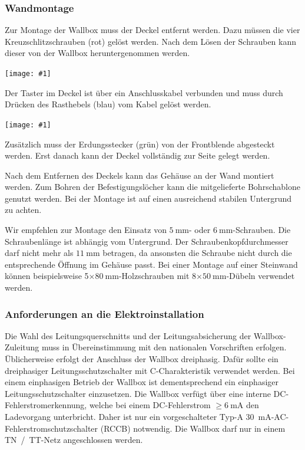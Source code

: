 \documentclass[a4paper,10pt]{article}
\newcommand{\hint}[1]{\begin{tcolorbox}[colback=boxgray,colframe=black,coltext=
white,title=Hinweis,left*=2mm,right*=2mm,boxsep=1mm,bottom=1mm,top=1mm]#1\end{tcolorbox}}
\newcommand{\gfx}[1]{\texttt{[image: \#1]}}
\begin{document}
\begin{multicols*}{2}
    \subsubsection{Wandmontage}\label{wandmontage}
    Zur Montage der Wallbox muss der Deckel entfernt werden. Dazu müssen die
    vier Kreuzschlitzschrauben (rot) gelöst werden.
    Nach dem Lösen der Schrauben kann dieser von der Wallbox heruntergenommen
    werden.

    \gfx{./img_warp3/resized/warp_screw_points_ready}


    \hint{Der Taster im Deckel ist über ein Anschlusskabel verbunden und muss
        durch Drücken des Rasthebels (blau) vom Kabel gelöst werden.}

    \gfx{./img_warp3/resized/warp3_frontLEDcable_arrow.jpg}

    Zusätzlich muss der Erdungsstecker (grün) von der Front\-blende abgesteckt werden.
    Erst danach kann der Deckel vollständig zur Seite gelegt werden.

    Nach dem Entfernen des Deckels kann das Gehäuse an der Wand montiert werden. Zum
    Bohren der Befestigungslöcher kann die mitgelieferte Bohrschablone genutzt
    werden. Bei der Montage ist auf einen ausreichend stabilen Untergrund zu
    achten.

    Wir empfehlen zur Montage den Einsatz von $\SI{5}{\milli\meter}$- oder
    $\SI{6}{\milli\meter}$-Schrauben. Die Schraubenlänge ist abhängig vom
    Untergrund. Der Schraubenkopfdurchmesser darf nicht mehr als
    $\SI{11}{\milli\meter}$ betragen, da ansonsten die Schraube nicht durch die
    entsprechende Öffnung im Gehäuse passt. Bei einer Montage auf einer Steinwand
    können beispielsweise 5$\times\SI{80}{\milli\meter}$-Holzschrauben
    mit 8$\times\SI{50}{\milli\meter}$-Dübeln verwendet werden.

    \subsubsection{Anforderungen an die Elektroinstallation}
    Die Wahl des Leitungsquerschnitts und der Lei\-tungs\-ab\-sicher\-ung der
    Wallbox-Zuleitung muss in Übereinstimmung mit den nationalen Vorschriften
    erfolgen. Üblicherweise erfolgt der Anschluss der Wallbox dreiphasig.
    Dafür sollte ein dreiphasiger Leitungsschutzschalter mit C-Charakteristik
    verwendet werden. Bei einem einphasigen Betrieb der Wallbox ist
    dementsprechend ein einphasiger Leitungsschutzschalter einzusetzen.
    Die Wallbox verfügt über eine interne DC-Fehlerstromerkennung, welche
    bei einem DC-Fehlerstrom $\geq \SI{6}{\milli\ampere}$ den Ladevorgang
    unterbricht. Daher ist nur ein vorgeschalteter Typ-A \SI{30}{\milli\ampere}-AC-Fehlerstromschutzschalter (RCCB)
    notwendig.
    Die Wallbox darf nur in einem TN~/~TT-Netz angeschlossen werden.


\end{multicols*}
\end{document}
